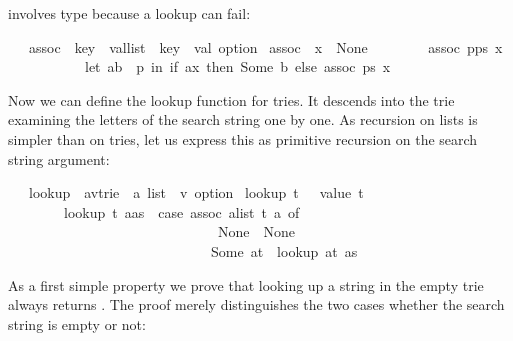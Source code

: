 \begin{isabellebody}
\begin{isamarkuptext}
involves type  because a lookup can fail:%
\end{isamarkuptext}%
\isamarkuptrue%
\ \ \ assoc\ {\isacharcolon}{\isacharcolon}\ {\isachardoublequote}{\isacharparenleft}{\isacharprime}key\ {\isacharasterisk}\ {\isacharprime}val{\isacharparenright}list\ {\isasymRightarrow}\ {\isacharprime}key\ {\isasymRightarrow}\ {\isacharprime}val\ option{\isachardoublequote}\isanewline
\isamarkupfalse%
\ {\isachardoublequote}assoc\ {\isacharbrackleft}{\isacharbrackright}\ x\ {\isacharequal}\ None{\isachardoublequote}\isanewline
\ \ \ \ \ \ \ \ {\isachardoublequote}assoc\ {\isacharparenleft}p{\isacharhash}ps{\isacharparenright}\ x\ {\isacharequal}\isanewline
\ \ \ \ \ \ \ \ \ \ \ {\isacharparenleft}let\ {\isacharparenleft}a{\isacharcomma}b{\isacharparenright}\ {\isacharequal}\ p\ in\ if\ a{\isacharequal}x\ then\ Some\ b\ else\ assoc\ ps\ x{\isacharparenright}{\isachardoublequote}\isamarkupfalse%
%
\begin{isamarkuptext}%
Now we can define the lookup function for tries. It descends into the trie
examining the letters of the search string one by one. As
recursion on lists is simpler than on tries, let us express this as primitive
recursion on the search string argument:%
\end{isamarkuptext}%
\isamarkuptrue%
\ \ \ lookup\ {\isacharcolon}{\isacharcolon}\ {\isachardoublequote}{\isacharparenleft}{\isacharprime}a{\isacharcomma}{\isacharprime}v{\isacharparenright}trie\ {\isasymRightarrow}\ {\isacharprime}a\ list\ {\isasymRightarrow}\ {\isacharprime}v\ option{\isachardoublequote}\isanewline
\isamarkupfalse%
\ {\isachardoublequote}lookup\ t\ {\isacharbrackleft}{\isacharbrackright}\ {\isacharequal}\ value\ t{\isachardoublequote}\isanewline
\ \ \ \ \ \ \ \ {\isachardoublequote}lookup\ t\ {\isacharparenleft}a{\isacharhash}as{\isacharparenright}\ {\isacharequal}\ {\isacharparenleft}case\ assoc\ {\isacharparenleft}alist\ t{\isacharparenright}\ a\ of\isanewline
\ \ \ \ \ \ \ \ \ \ \ \ \ \ \ \ \ \ \ \ \ \ \ \ \ \ \ \ \ \ None\ {\isasymRightarrow}\ None\isanewline
\ \ \ \ \ \ \ \ \ \ \ \ \ \ \ \ \ \ \ \ \ \ \ \ \ \ \ \ {\isacharbar}\ Some\ at\ {\isasymRightarrow}\ lookup\ at\ as{\isacharparenright}{\isachardoublequote}\isamarkupfalse%
%
\begin{isamarkuptext}%
As a first simple property we prove that looking up a string in the empty
trie  always returns . The proof merely
distinguishes the two cases whether the search string is empty or not:%

\end{isamarkuptext}
\end{isabellebody}

